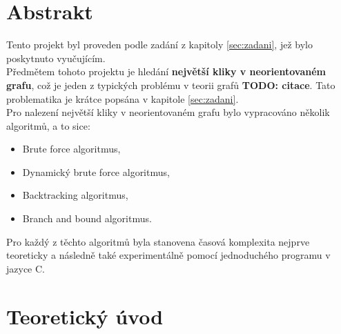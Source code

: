 \documentclass[a4paper]{article}
\begin{document}
\section{Abstrakt} \label{sec:abstrakt}
Tento projekt byl proveden podle zadání z kapitoly \ref{sec:zadani}, jež bylo poskytnuto vyučujícím.\\

\noindent
Předmětem tohoto projektu je hledání \textbf{největší kliky v neorientovaném grafu}, což je jeden z typických problému v teorii grafů \textbf{TODO: citace}. Tato problematika je krátce popsána v kapitole \ref{sec:zadani}.\\

\noindent
Pro nalezení největší kliky v neorientovaném grafu bylo vypracováno několik algoritmů, a to sice:
\begin{itemize}
    \item Brute force algoritmus,
    \item Dynamický brute force algoritmus,
    \item Backtracking algoritmus,
    \item Branch and bound algoritmus.
\end{itemize}
Pro každý z těchto algoritmů byla stanovena časová komplexita nejprve teoreticky a následně také experimentálně pomocí jednoduchého programu v jazyce C.

\section{Teoretický úvod} \label{sec:teorie}

    
\end{document}
